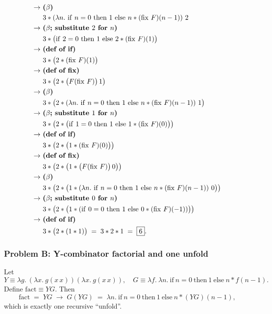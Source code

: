 \documentclass{article}
\theoremstyle{theorem}
\theoremstyle{definition}
\theoremstyle{remark}
\begin{document}
\[\begin{aligned}
\to\ &\text{\textbf{($\beta$)}}\\
&3 * (\lambda n.\ \mathrm{if}\ n=0\ \mathrm{then}\ 1\ \mathrm{else}\ n * (\mathrm{fix}\ F)(n-1))\ 2\\
\to\ &\text{\textbf{($\beta$; substitute $2$ for $n$)}}\\
&3 * \big(\mathrm{if}\ 2=0\ \mathrm{then}\ 1\ \mathrm{else}\ 2 * (\mathrm{fix}\ F)(1)\big)\\
\to\ &\text{\textbf{(def of if)}}\\
&3 * \big(2 * (\mathrm{fix}\ F)(1)\big)\\
\to\ &\text{\textbf{(def of fix)}}\\
&3 * \big(2 * \big(F(\mathrm{fix}\ F)\big)\,1\big)\\
\to\ &\text{\textbf{($\beta$)}}\\
&3 * \big(2 * (\lambda n.\ \mathrm{if}\ n=0\ \mathrm{then}\ 1\ \mathrm{else}\ n * (\mathrm{fix}\ F)(n-1))\ 1\big)\\
\to\ &\text{\textbf{($\beta$; substitute $1$ for $n$)}}\\
&3 * \big(2 * \big(\mathrm{if}\ 1=0\ \mathrm{then}\ 1\ \mathrm{else}\ 1 * (\mathrm{fix}\ F)(0)\big)\big)\\
\to\ &\text{\textbf{(def of if)}}\\
&3 * \big(2 * \big(1 * (\mathrm{fix}\ F)(0)\big)\big)\\
\to\ &\text{\textbf{(def of fix)}}\\
&3 * \big(2 * \big(1 * \big(F(\mathrm{fix}\ F)\big)\,0\big)\big)\\
\to\ &\text{\textbf{($\beta$)}}\\
&3 * \big(2 * \big(1 * (\lambda n.\ \mathrm{if}\ n=0\ \mathrm{then}\ 1\ \mathrm{else}\ n * (\mathrm{fix}\ F)(n-1))\ 0\big)\big)\\
\to\ &\text{\textbf{($\beta$; substitute $0$ for $n$)}}\\
&3 * \big(2 * \big(1 * (\mathrm{if}\ 0=0\ \mathrm{then}\ 1\ \mathrm{else}\ 0 * (\mathrm{fix}\ F)(-1))\big)\big)\\
\to\ &\text{\textbf{(def of if)}}\\
&3 * \big(2 * (1 * 1)\big) \;=\; 3 * 2 * 1 \;=\; \boxed{6}.
\end{aligned}
\]

\subsubsection*{Problem B: Y-combinator factorial and one unfold}
Let
\[
Y \equiv \lambda g.\ (\lambda x.\ g(x\,x))(\lambda x.\ g(x\,x)),\quad
G \equiv \lambda f.\ \lambda n.\ \mathrm{if}\ n=0\ \mathrm{then}\ 1\ \mathrm{else}\ n * f(n-1).
\]
Define $\mathrm{fact} \equiv YG$. Then
\[
\mathrm{fact} \;=\; YG \;\to\; G(YG) \;=\; \lambda n.\ \mathrm{if}\ n=0\ \mathrm{then}\ 1\ \mathrm{else}\ n * (YG)(n-1),
\]
which is exactly one recursive ``unfold''.
\end{document}
